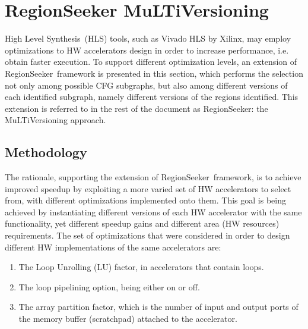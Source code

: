 \documentclass[]{usiinfthesis}
\newcommand{\rseeker}{{RegionSeeker}}
\newcommand{\HLS}{{High Level Synthesis}}
\begin{document}
%
%
%
%

\newpage
%
%
%
%
%
%
\section{RegionSeeker MuLTiVersioning}

\HLS\ (HLS) tools, such as Vivado HLS by Xilinx, may employ %
optimizations to HW accelerators
design in order to increase performance, i.e. obtain faster execution. 
To support different optimization levels, an extension of \rseeker\ framework 
is presented in this section, 
which performs the selection not 
only among possible CFG subgraphs, but also among different versions of each identified 
subgraph, namely different versions of the regions identified. 
This extension is referred to in the rest of the document as RegionSeeker: the 
MuLTiVersioning approach.


\subsection{Methodology}
\label{subsec:mv_meth}

The rationale, supporting the extension of \rseeker\ framework, is to achieve improved
speedup by exploiting a more varied set of HW accelerators to select from, 
with different optimizations implemented onto them. This goal is being achieved by instantiating 
different versions of each HW accelerator with the same functionality, yet different speedup gains 
and different area (HW resources) requirements. The set of optimizations that were considered in 
order to design different HW implementations of the same accelerators are: 
\begin{enumerate}
\item The Loop Unrolling 
(LU) factor, in accelerators that contain loops.
\item The loop pipelining option, being either on or off.
\item The array partition factor, 
which is the number of input and output ports of the memory buffer (scratchpad) attached 
to the accelerator.
\end{enumerate}\par
\end{document}
